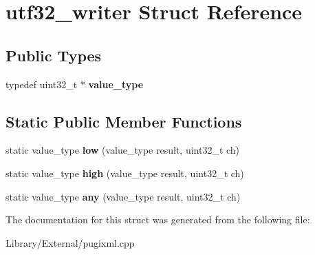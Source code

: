 \hypertarget{structutf32__writer}{}\section{utf32\+\_\+writer Struct Reference}
\label{structutf32__writer}
\subsection*{Public Types}
\begin{DoxyCompactItemize}
\item 
\hypertarget{structutf32__writer_a2284e1fa3406f113f151ded2aaa8d4ae}{}typedef uint32\+\_\+t $\ast$ {\bfseries value\+\_\+type}\label{structutf32__writer_a2284e1fa3406f113f151ded2aaa8d4ae}

\end{DoxyCompactItemize}
\subsection*{Static Public Member Functions}
\begin{DoxyCompactItemize}
\item 
\hypertarget{structutf32__writer_a06e1b65906f7355ea54a622248095bc7}{}static value\+\_\+type {\bfseries low} (value\+\_\+type result, uint32\+\_\+t ch)\label{structutf32__writer_a06e1b65906f7355ea54a622248095bc7}

\item 
\hypertarget{structutf32__writer_a3f86d996cde3ed7cab5c31930b67c9f1}{}static value\+\_\+type {\bfseries high} (value\+\_\+type result, uint32\+\_\+t ch)\label{structutf32__writer_a3f86d996cde3ed7cab5c31930b67c9f1}

\item 
\hypertarget{structutf32__writer_aa94aaa4a13e755942e7da70ea7700d3e}{}static value\+\_\+type {\bfseries any} (value\+\_\+type result, uint32\+\_\+t ch)\label{structutf32__writer_aa94aaa4a13e755942e7da70ea7700d3e}

\end{DoxyCompactItemize}


The documentation for this struct was generated from the following file\+:\begin{DoxyCompactItemize}
\item 
Library/\+External/pugixml.\+cpp\end{DoxyCompactItemize}
